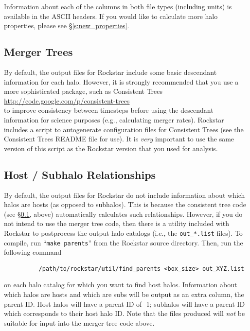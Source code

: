 \documentclass[12pt]{article}
\begin{document}
Information about each of the columns in both file types (including units) is available in the ASCII headers.  If you would like to calculate more halo properties, please see \S \ref{s:new_properties}.  



\subsection{Merger Trees}
	\label{s:merger_trees}
      By default, the output files for Rockstar include some basic descendant
      information for each halo.  However, it is strongly recommended that
      you use a more sophisticated package, such as Consistent Trees\\[1ex]
      \url{http://code.google.com/p/consistent-trees}\\[1ex] 
      to improve consistency
      between timesteps before using the descendant information for science
      purposes (e.g., calculating merger rates).  Rockstar includes a script
      to autogenerate configuration files for Consistent Trees (see the
      Consistent Trees README file for use).  It is \textit{very} important to use the
      same version of this script as the Rockstar version that you used for analysis.

\subsection{Host / Subhalo Relationships}
      By default, the output files for Rockstar do not include information
      about which halos are hosts (as opposed to subhalos).  This is because
      the consistent tree code (see \S \ref{s:merger_trees}, above) automatically
      calculates such relationships.  However, if you do not intend to use the
      merger tree code, then there is a utility included with Rockstar to
      postprocess the output halo catalogs (i.e., the \texttt{out\_*.list} files).  To
      compile, run ``\texttt{make parents}'' from the Rockstar source directory.  Then,
      run the following command
\begin{verbatim}
      	  /path/to/rockstar/util/find_parents <box_size> out_XYZ.list
\end{verbatim}
      on each halo catalog for which you want to find host halos.  Information
      about which halos are hosts and which are subs will be output as an
      extra column, the parent ID.  Host halos will have a parent ID of -1;
      subhalos will have a parent ID which corresponds to their host halo ID.
      Note that the files produced will \textit{not} be suitable for input into the
      merger tree code above.
\end{document}
